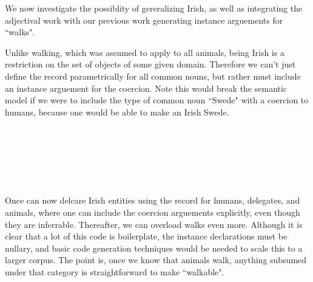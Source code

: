 We now investigate the possiblity of gereralizing Irish, as well as integrating
the adjectival work with our previous work generating instance arguements for
``walks".

Unlike walking, which was assumed to apply to all animals, being Irish is a
restriction on the set of objects of some given domain. Therefore we can't just
define the record parametrically for all common nouns, but rather must include
an instance arguement for the coercion. Note this would break the semantic model
if we were to include the type of common noun ``Swede" with a coercion to
humans, because one would be able to make an Irish Swede.

\begin{code}%
\>[0]\AgdaSpace{}%
\AgdaSpace{}%
\AgdaSymbol{(}\AgdaSpace{}%
\AgdaSymbol{:}\AgdaSpace{}%
\AgdaSymbol{)}\AgdaSpace{}%
\AgdaSymbol{\{\{}\AgdaSpace{}%
\AgdaSymbol{:}\AgdaSpace{}%
\AgdaSpace{}%
\AgdaSpace{}%
\AgdaSymbol{\}\}}\AgdaSpace{}%
\AgdaSymbol{:}\AgdaSpace{}%
\AgdaSpace{}%
\<%
\\
\>[0][@{}l@{\AgdaIndent{0}}]%
\>[2]\<%
\\
\>[2][@{}l@{\AgdaIndent{0}}]%
\>[4]\<%
\\
%
\>[2]\<%
\\
\>[2][@{}l@{\AgdaIndent{0}}]%
\>[4]\AgdaSpace{}%
\AgdaSymbol{:}\AgdaSpace{}%
\<%
\\
%
\>[4]\AgdaSpace{}%
\AgdaSymbol{:}\AgdaSpace{}%
\AgdaSpace{}%
\AgdaOperator{\AgdaFunction{\$}}\AgdaSpace{}%
\<%
\end{code}
\begin{code}[hide]%
\>[0]\AgdaSpace{}%
\AgdaSpace{}%
\AgdaSpace{}%
\<%
\end{code}

Once can now delcare Irish entities using the record for humans, delegates, and
animals, where one can include the coercion arguements explicitly, even though
they are inferrable. Thereafter, we can overload walks even more. Although it is
clear that a lot of this code is boilerplate, the instance declarations must be
nullary, and basic code generation techniques would be needed to scale this to a
larger corpus. The point is, once we know that animals walk, anything subsumed
under that category is straightforward to make ``walkable".

